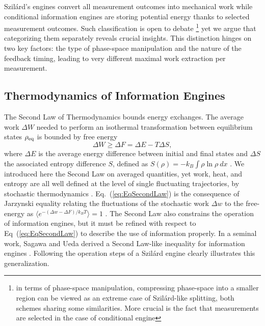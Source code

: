 \documentclass[aps, twocolumn,floatfix,showpacs, superscriptaddress]{revtex4-2}
\newcommand{\ie}{information engines }
\newcommand{\IE}{Information Engines }
\begin{document}
Szil\'ard's engines convert all measurement outcomes into mechanical work while conditional \ie are storing potential energy thanks to selected measurement outcomes. 
Such classification is open to debate \footnote{in terms of phase-space manipulation, compressing phase-space into a smaller region can be viewed as an extreme case of Szil\'ard-like splitting, both schemes sharing some similarities. More crucial is the fact that measurements are selected in the case of conditional engine} yet we argue that categorizing them separately reveals crucial insights. This distinction hinges on two key factors: the type of phase-space manipulation and the nature of the feedback timing, leading to very different maximal work extraction per measurement.



\subsection{Thermodynamics of \IE}
\label{Sec:Thermo}

The Second Law of Thermodynamics bounds energy exchanges.
The average work $\Delta W$ needed to perform an isothermal transformation between equilibrium states $\rho_{\rm eq}$ is bounded by free energy
\begin{equation}
    \Delta W \geq \Delta F = \Delta E - T \Delta S,
    \label{eq:EqSecondLaw}
\end{equation}
where $\Delta E$ is the average energy difference between initial and final states and $\Delta S$ the associated entropy difference $S$, defined as $S(\rho) = -k_B \int \rho \ln \rho ~dx$ \cite{Seifert2005}.
We introduced here the Second Law on averaged quantities, yet work, heat, and entropy are all well defined at the level of single fluctuating trajectories, by stochastic thermodynamics \cite{Sekimoto1998, SekimotoBook, seifert2012stochastic}.
Eq.~(\ref{eq:EqSecondLaw}) is the consequence of Jarzynski equality relating the fluctuations of the stochastic work $\Delta w$ to the free-energy as $\langle e^{-(\Delta w-\Delta F)/k_B T} \rangle = 1$ \cite{Jarzynski1997}.
The Second Law also constrains the operation of information engines, but it must be refined with respect to Eq~(\ref{eq:EqSecondLaw}) to describe the use of information properly.
In a seminal work, Sagawa and Ueda derived a Second Law-like inequality for information engines \cite{sagawa_generalized_2010}.
Following the operation steps of a Szil\'ard engine clearly illustrates this generalization.
\end{document}
